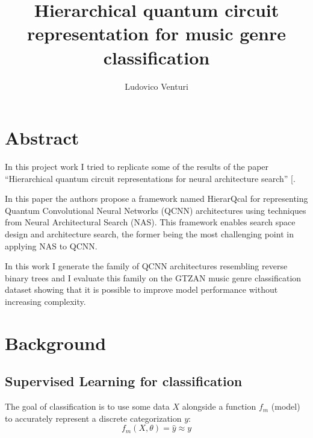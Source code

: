 \documentclass[
  13pt,
  a4paper,
  DIV=11,
  numbers=noendperiod]{scrreprt}
\title{Hierarchical quantum circuit representation for music genre
classification}
\author{Ludovico Venturi}
\date{}
\renewcommand*\contentsname{Table of contents}
\newcommand\contentsname{Table of contents}
\begin{document}
\maketitle


\renewcommand*\contentsname{Table of contents}
{
\hypersetup{linkcolor=}
\setcounter{tocdepth}{2}
\tableofcontents
}

\chapter*{Abstract}\label{abstract}


In this project work I tried to replicate some of the results of the
paper ``Hierarchical quantum circuit representations for neural
architecture search'' {[}\citeproc{ref-lourens2023hierarchical}{1}{]}.

In this paper the authors propose a framework named HierarQcal for
representing Quantum Convolutional Neural Networks (QCNN) architectures
using techniques from Neural Architectural Search (NAS). This framework
enables search space design and architecture search, the former being
the most challenging point in applying NAS to QCNN.

In this work I generate the family of QCNN architectures resembling
reverse binary trees and I evaluate this family on the GTZAN music genre
classification dataset showing that it is possible to improve model
performance without increasing complexity.


\chapter{Background}\label{background}

\section{Supervised Learning for
classification}\label{supervised-learning-for-classification}

The goal of classification is to use some data \(X\) alongside a
function \(f_m\) (model) to accurately represent a discrete
categorization \(y\): \[
f_m(X, \theta) = \widehat{y} \approx y
\]
\end{document}
